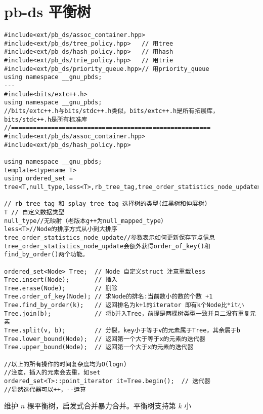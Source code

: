 \section{pb-ds 平衡树}

\begin{verbatim}
#include<ext/pb_ds/assoc_container.hpp>
#include<ext/pb_ds/tree_policy.hpp>   // 用tree
#include<ext/pb_ds/hash_policy.hpp>   // 用hash
#include<ext/pb_ds/trie_policy.hpp>   // 用trie
#include<ext/pb_ds/priority_queue.hpp>// 用priority_queue
using namespace __gnu_pbds;
---
#include<bits/extc++.h>
using namespace __gnu_pbds;
//bits/extc++.h与bits/stdc++.h类似，bits/extc++.h是所有拓展库，bits/stdc++.h是所有标准库
//=======================================================
#include<ext/pb_ds/assoc_container.hpp>
#include<ext/pb_ds/hash_policy.hpp>

using namespace __gnu_pbds;
template<typename T>
using ordered_set = tree<T,null_type,less<T>,rb_tree_tag,tree_order_statistics_node_update>;

// rb_tree_tag 和 splay_tree_tag 选择树的类型(红黑树和伸展树)
T // 自定义数据类型
null_type//无映射（老版本g++为null_mapped_type）
less<T>//Node的排序方式从小到大排序
tree_order_statistics_node_update//参数表示如何更新保存节点信息 tree_order_statistics_node_update会额外获得order_of_key()和find_by_order()两个功能。

ordered_set<Node> Tree;  // Node 自定义struct 注意重载less
Tree.insert(Node);       // 插入
Tree.erase(Node);        // 删除
Tree.order_of_key(Node); // 求Node的排名:当前数小的数的个数 +1
Tree.find_by_order(k);   // 返回排名为k+1的iterator 即有k个Node比*it小
Tree.join(b);            // 将b并入Tree，前提是两棵树类型一致并且二没有重复元素
Tree.split(v, b);        // 分裂，key小于等于v的元素属于Tree，其余属于b
Tree.lower_bound(Node);  // 返回第一个大于等于x的元素的迭代器
Tree.upper_bound(Node);  // 返回第一个大于x的元素的迭代器

//以上的所有操作的时间复杂度均为O(logn)
//注意，插入的元素会去重，如set
ordered_set<T>::point_iterator it=Tree.begin();  // 迭代器
//显然迭代器可以++，--运算
\end{verbatim}
\par \noindent  维护 $n$ 棵平衡树，启发式合并暴力合并。平衡树支持第 $k$ 小

